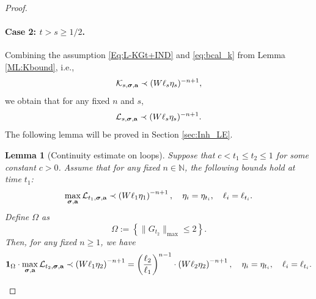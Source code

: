 \documentclass[10pt,reqno]{article}
\theoremstyle{plain} %
\newtheorem{lemma}[theorem]{Lemma}
\theoremstyle{remark}
\numberwithin{equation}{section}
\begin{document}
\begin{proof}
\paragraph{Case 2: \(t > s \geq 1/2\).} 
Combining the assumption \eqref{Eq:L-KGt+IND} and \eqref{eq:bcal_k} from Lemma \ref{ML:Kbound}, i.e., 
$$
{\cal K}_{s, \boldsymbol{\sigma}, \textbf{a}} \prec (W\ell_s\eta_s)^{-n+1}, 
$$
we obtain that for any fixed \(n\) and \(s\), 
\begin{equation}\label{Lboundfors}
    {\cal L}_{s, \boldsymbol{\sigma}, \textbf{a}} \prec (W\ell_s\eta_s)^{-n+1}.
\end{equation}
The following lemma will be proved in Section \ref{sec:Inh_LE}.



\begin{lemma}[Continuity  estimate on loops]\label{lem_ConArg}
Suppose that \(c < t_1 \leq t_2 \leq 1\) for some constant \(c > 0\). Assume that for any fixed \(n \in \mathbb{N}\), the following bounds hold at time \(t_1\): 
\begin{equation}\label{55}
    \max_{\boldsymbol{\sigma}, \textbf{a}} {\cal L}_{t_1, \boldsymbol{\sigma}, \textbf{a}} \prec \left( W \ell_1 \eta_1 \right)^{-n+1}, \quad \eta_i = \eta_{t_i}, \quad \ell_i = \ell_{t_i}.
\end{equation}
Define \(\Omega\) as 
\begin{equation}\label{usuayzoo}
    \Omega := \left\{\|G_{t_2}\|_{\max} \leq 2\right\}.
\end{equation}
Then, for any fixed \(n \geq 1\), we have
\begin{equation}\label{res_lo_bo_eta}
    {\bf 1}_\Omega \cdot \max_{\boldsymbol{\sigma}, \textbf{a}} {\cal L}_{t_2, \boldsymbol{\sigma}, \textbf{a}} \prec \left( W \ell_1 \eta_2 \right)^{-n+1} = \left( \frac{\ell_2}{\ell_1} \right)^{n-1} \cdot \left( W \ell_2 \eta_2 \right)^{-n+1}, \quad \eta_i = \eta_{t_i}, \quad \ell_i = \ell_{t_i}.
\end{equation}
\end{lemma}


\end{proof}
\end{document}
